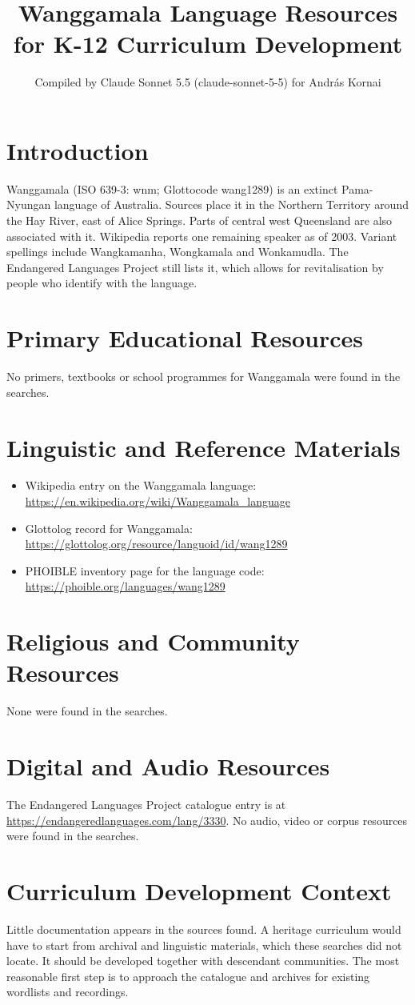 \documentclass[12pt]{article}
\title{Wanggamala Language Resources for K-12 Curriculum Development}
\author{Compiled by Claude Sonnet 5.5 (claude-sonnet-5-5) for Andr\'as Kornai}
\date{}
\begin{document}
\maketitle

\section{Introduction}
Wanggamala (ISO 639-3: wnm; Glottocode wang1289) is an extinct Pama-Nyungan language of Australia. Sources place it in the Northern Territory around the Hay River, east of Alice Springs. Parts of central west Queensland are also associated with it. Wikipedia reports one remaining speaker as of 2003. Variant spellings include Wangkamanha, Wongkamala and Wonkamudla. The Endangered Languages Project still lists it, which allows for revitalisation by people who identify with the language.

\section{Primary Educational Resources}
No primers, textbooks or school programmes for Wanggamala were found in the searches.

\section{Linguistic and Reference Materials}
\begin{itemize}
\item Wikipedia entry on the Wanggamala language: \url{https://en.wikipedia.org/wiki/Wanggamala_language}
\item Glottolog record for Wanggamala: \url{https://glottolog.org/resource/languoid/id/wang1289}
\item PHOIBLE inventory page for the language code: \url{https://phoible.org/languages/wang1289}
\end{itemize}

\section{Religious and Community Resources}
None were found in the searches.

\section{Digital and Audio Resources}
The Endangered Languages Project catalogue entry is at \url{https://endangeredlanguages.com/lang/3330}. No audio, video or corpus resources were found in the searches.

\section{Curriculum Development Context}
Little documentation appears in the sources found. A heritage curriculum would have to start from archival and linguistic materials, which these searches did not locate. It should be developed together with descendant communities. The most reasonable first step is to approach the catalogue and archives for existing wordlists and recordings.
\end{document}
